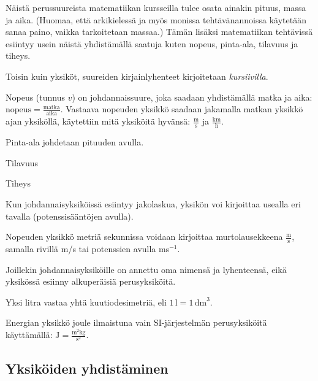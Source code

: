 Näistä perussuureista matematiikan kursseilla tulee osata ainakin pituus, massa ja aika. (Huomaa, että arkikielessä ja myös monissa tehtävänannoissa käytetään sanaa paino, vaikka tarkoitetaan massaa.) Tämän lisäksi matematiikan tehtävissä esiintyy usein näistä yhdistämällä saatuja  kuten nopeus, pinta-ala, tilavuus ja tiheys.

Toisin kuin yksiköt, suureiden kirjainlyhenteet kirjoitetaan \textit{kursiivilla}. %

\begin{esimerkki}

Nopeus (tunnus $v$) on johdannaissuure, joka saadaan yhdistämällä matka ja aika: $\text{nopeus}=\frac{\text{matka}}{\text{aika}}$. Vastaava nopeuden yksikkö saadaan jakamalla matkan yksikkö ajan yksiköllä, käytettiin mitä yksiköitä hyvänsä: $\frac{\text{m}}{\text{s}}$ ja $\frac{\text{km}}{\text{h}}$.

Pinta-ala johdetaan pituuden avulla.

Tilavuus

Tiheys
\end{esimerkki}

Kun johdannaisyksiköissä esiintyy jakolaskua, yksikön voi kirjoittaa usealla eri tavalla (potenssisääntöjen avulla).

\begin{esimerkki}

Nopeuden yksikkö metriä sekunnissa voidaan kirjoittaa murtolausekkeena $\frac{\text{m}}{\text{s}}$, samalla rivillä m/s tai potenssien avulla ms$^{-1}$.

\end{esimerkki}

Joillekin johdannaisyksiköille on annettu oma nimensä ja lyhenteensä, eikä yksikössä esiinny alkuperäisiä perusyksiköitä. 

\begin{esimerkki}

Yksi litra vastaa yhtä kuutiodesimetriä, eli $1\,\text{l}=1\,\text{dm}^3$.

Energian yksikkö joule ilmaistuna vain SI-järjestelmän perusyksiköitä käyttämällä: $\text{J}=\frac{\text{m}^2\text{kg}}{\text{s}^2}$.

\end{esimerkki}

\subsection*{Yksiköiden yhdistäminen}

